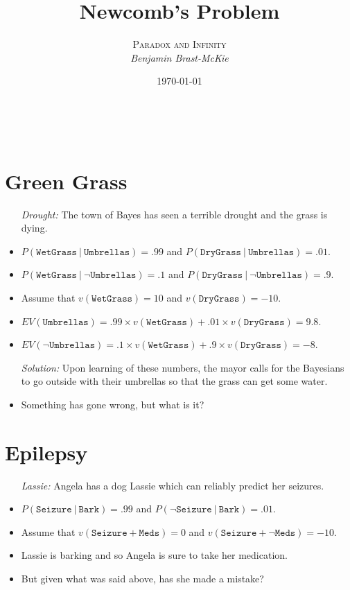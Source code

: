 \documentclass[a4paper, 11pt]{article} %
\title{\textbf{Newcomb's Problem}} %
\author{\textsc{Paradox and Infinity}\\ \em Benjamin Brast-McKie} %
\date{\today} %
\makeatletter
\renewcommand{\maketitle}{ %
\begin{flushright} %
{\LARGE\@title} %

\vspace{10pt} %

{\@author} %
\\\@date %

\vspace{-10pt} %
\end{flushright}
}
\makeatother
\begin{document}
\maketitle %

\thispagestyle{empty}


\section*{Green Grass}

\begin{itemize}
  \item[\it Drought:] The town of Bayes has seen a terrible drought and the grass is dying.
    \item $P(\texttt{WetGrass}\ |\ \texttt{Umbrellas})=.99$ and $P(\texttt{DryGrass}\ |\ \texttt{Umbrellas}) = .01$.
    \item $P(\texttt{WetGrass}\ |\ \neg\texttt{Umbrellas})=.1$ and $P(\texttt{DryGrass}\ |\ \neg\texttt{Umbrellas}) = .9$.
    \item Assume that $v(\texttt{WetGrass}) = 10$ and $v(\texttt{DryGrass}) = -10$.
    \item $EV(\texttt{Umbrellas}) = .99 \times v(\texttt{WetGrass}) + .01 \times v(\texttt{DryGrass}) = 9.8$.
    \item $EV(\neg\texttt{Umbrellas}) = .1 \times v(\texttt{WetGrass}) + .9 \times v(\texttt{DryGrass}) = -8$.
  \item[\it Solution:] Upon learning of these numbers, the mayor calls for the Bayesians to go outside with their umbrellas so that the grass can get some water. 
    \item Something has gone wrong, but what is it?
\end{itemize}




\section*{Epilepsy}

\begin{itemize}
  \item[\it Lassie:] Angela has a dog Lassie which can reliably predict her seizures.
    \item $P(\texttt{Seizure}\ |\ \texttt{Bark})=.99$ and $P(\neg\texttt{Seizure}\ |\ \texttt{Bark}) = .01$.
    \item Assume that $v(\texttt{Seizure} + \texttt{Meds}) = 0$ and $v(\texttt{Seizure} + \neg \texttt{Meds}) = -10$.
    \item Lassie is barking and so Angela is sure to take her medication.
    \item But given what was said above, has she made a mistake?
\end{itemize}
\end{document}
